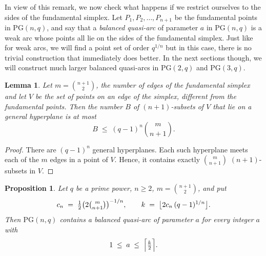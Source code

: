\documentclass{article}
\newtheorem{lemma}{Lemma}
\newtheorem{proposition}{Proposition}
\newcommand{\PG}{\mathrm{PG}}
\begin{document}
In view of this remark, we now check what happens if we restrict ourselves to the sides of the fundamental simplex.
Let $P_1,P_2,\ldots,P_{n+1}$ be the fundamental points in $\PG(n,q)$, and say that a {\em balanced quasi-arc} of parameter $a$ in $\PG(n,q)$ is a weak arc whose points all lie on the sides of the fundamental simplex.
Just like for weak arcs, we will find a point set of order $q^{1/n}$ but in this case, there is no trivial construction that immediately does better. In the next sections though, we will construct much larger balanced quasi-arcs in $\PG(2,q)$ and $\PG(3,q).$






\begin{lemma}\label{lem:hyperplanes}
Let $m=\binom{n+1}{2}$, the number of edges of the fundamental simplex and let $V$ be the set of points on an edge of the simplex, different from the fundamental points. Then the number $B$ of
$(n+1)$-subsets of $V$ that lie on a general hyperplane is at most
\[
B\;\le\;(q-1)^n\binom{m}{n+1}.
\]
\end{lemma}

\begin{proof}
There are $(q-1)^n$ general hyperplanes. Each such
hyperplane meets each of the $m$ edges in a point  of $V$. Hence, it contains exactly $\binom{m}{n+1}$  $(n+1)$-subsets in $V$. 
\end{proof}

\begin{proposition}\label{thm:balanced}
Let $q$ be a prime power, $n\ge2$, $m=\binom{n+1}{2}$, and put
\[
c_n\;=\;\tfrac12\bigl(2\tbinom{m}{n+1}\bigr)^{-1/n},
\qquad
k\;=\;\bigl\lfloor 2c_n\,(q-1)^{1/n}\bigr\rfloor .
\]
Then $\PG(n,q)$ contains a balanced quasi-arc of parameter $a$ for
\emph{every} integer $a$ with
\[
1\;\le\;a\;\le\;\Bigl\lceil \tfrac{k}{2}\Bigr\rceil .
\]
\end{proposition}
\end{document}
